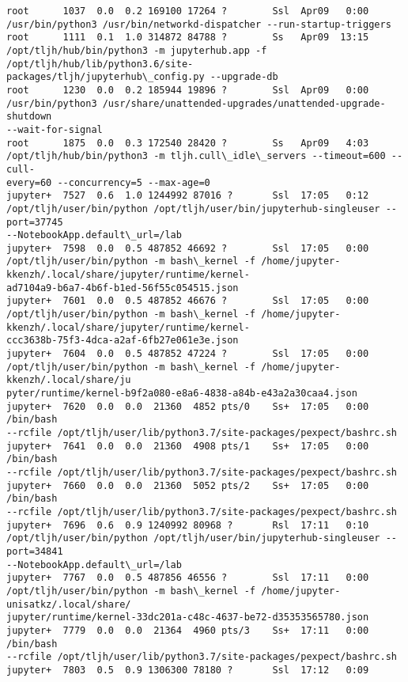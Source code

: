 \documentclass[11pt]{article}
\begin{document}
    \begin{Verbatim}[commandchars=\\\{\}]
root      1037  0.0  0.2 169100 17264 ?        Ssl  Apr09   0:00
/usr/bin/python3 /usr/bin/networkd-dispatcher --run-startup-triggers
root      1111  0.1  1.0 314872 84788 ?        Ss   Apr09  13:15
/opt/tljh/hub/bin/python3 -m jupyterhub.app -f /opt/tljh/hub/lib/python3.6/site-
packages/tljh/jupyterhub\_config.py --upgrade-db
root      1230  0.0  0.2 185944 19896 ?        Ssl  Apr09   0:00
/usr/bin/python3 /usr/share/unattended-upgrades/unattended-upgrade-shutdown
--wait-for-signal
root      1875  0.0  0.3 172540 28420 ?        Ss   Apr09   4:03
/opt/tljh/hub/bin/python3 -m tljh.cull\_idle\_servers --timeout=600 --cull-
every=60 --concurrency=5 --max-age=0
jupyter+  7527  0.6  1.0 1244992 87016 ?       Ssl  17:05   0:12
/opt/tljh/user/bin/python /opt/tljh/user/bin/jupyterhub-singleuser --port=37745
--NotebookApp.default\_url=/lab
jupyter+  7598  0.0  0.5 487852 46692 ?        Ssl  17:05   0:00
/opt/tljh/user/bin/python -m bash\_kernel -f /home/jupyter-
kkenzh/.local/share/jupyter/runtime/kernel-
ad7104a9-b6a7-4b6f-b1ed-56f55c054515.json
jupyter+  7601  0.0  0.5 487852 46676 ?        Ssl  17:05   0:00
/opt/tljh/user/bin/python -m bash\_kernel -f /home/jupyter-
kkenzh/.local/share/jupyter/runtime/kernel-
ccc3638b-75f3-4dca-a2af-6fb27e061e3e.json
jupyter+  7604  0.0  0.5 487852 47224 ?        Ssl  17:05   0:00
/opt/tljh/user/bin/python -m bash\_kernel -f /home/jupyter-kkenzh/.local/share/ju
pyter/runtime/kernel-b9f2a080-e8a6-4838-a84b-e43a2a30caa4.json
jupyter+  7620  0.0  0.0  21360  4852 pts/0    Ss+  17:05   0:00 /bin/bash
--rcfile /opt/tljh/user/lib/python3.7/site-packages/pexpect/bashrc.sh
jupyter+  7641  0.0  0.0  21360  4908 pts/1    Ss+  17:05   0:00 /bin/bash
--rcfile /opt/tljh/user/lib/python3.7/site-packages/pexpect/bashrc.sh
jupyter+  7660  0.0  0.0  21360  5052 pts/2    Ss+  17:05   0:00 /bin/bash
--rcfile /opt/tljh/user/lib/python3.7/site-packages/pexpect/bashrc.sh
jupyter+  7696  0.6  0.9 1240992 80968 ?       Rsl  17:11   0:10
/opt/tljh/user/bin/python /opt/tljh/user/bin/jupyterhub-singleuser --port=34841
--NotebookApp.default\_url=/lab
jupyter+  7767  0.0  0.5 487856 46556 ?        Ssl  17:11   0:00
/opt/tljh/user/bin/python -m bash\_kernel -f /home/jupyter-unisatkz/.local/share/
jupyter/runtime/kernel-33dc201a-c48c-4637-be72-d35353565780.json
jupyter+  7779  0.0  0.0  21364  4960 pts/3    Ss+  17:11   0:00 /bin/bash
--rcfile /opt/tljh/user/lib/python3.7/site-packages/pexpect/bashrc.sh
jupyter+  7803  0.5  0.9 1306300 78180 ?       Ssl  17:12   0:09

\end{Verbatim}
\end{document}
